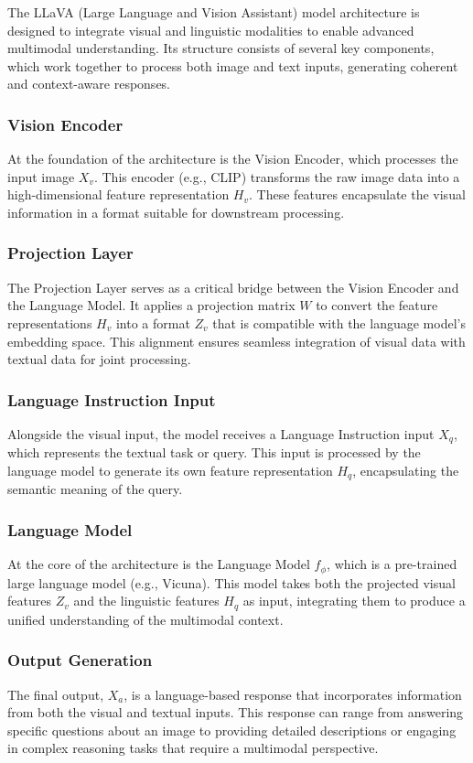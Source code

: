 \documentclass[12pt, conference, compsoc, onecolumn]{IEEEtran}
\begin{document}
	The LLaVA (Large Language and Vision Assistant) model architecture is designed to integrate visual and linguistic modalities to enable advanced multimodal understanding. Its structure consists of several key components, which work together to process both image and text inputs, generating coherent and context-aware responses.
	\subsubsection*{Vision Encoder} 
	At the foundation of the architecture is the Vision Encoder, which processes the input image $X_v$. This encoder (e.g., CLIP) transforms the raw image data into a high-dimensional feature representation $H_v$. These features encapsulate the visual information in a format suitable for downstream processing.
	
	\subsubsection*{Projection Layer} 
	The Projection Layer serves as a critical bridge between the Vision Encoder and the Language Model. It applies a projection matrix $W$ to convert the feature representations $H_v$ into a format $Z_v$ that is compatible with the language model's embedding space. This alignment ensures seamless integration of visual data with textual data for joint processing.
	
	\subsubsection*{Language Instruction Input}
	Alongside the visual input, the model receives a Language Instruction input $X_q$, which represents the textual task or query. This input is processed by the language model to generate its own feature representation $H_q$, encapsulating the semantic meaning of the query.
	
	\subsubsection*{Language Model}
	At the core of the architecture is the Language Model $f_\phi$, which is a pre-trained large language model (e.g., Vicuna). This model takes both the projected visual features $Z_v$ and the linguistic features $H_q$ as input, integrating them to produce a unified understanding of the multimodal context.
	
	\subsubsection*{Output Generation}
	The final output, $X_a$, is a language-based response that incorporates information from both the visual and textual inputs. This response can range from answering specific questions about an image to providing detailed descriptions or engaging in complex reasoning tasks that require a multimodal perspective.
	
\end{document}
